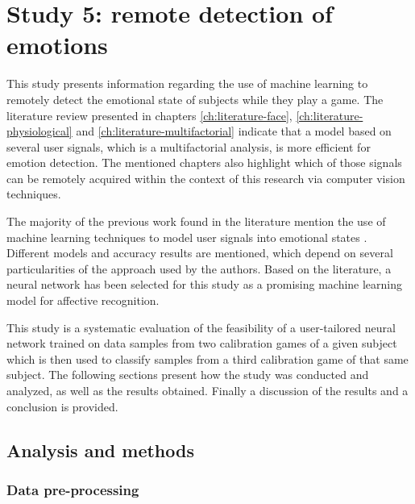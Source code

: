 \section{Study 5: remote detection of emotions}
\label{sec:experiment1-study5}

This study presents information regarding the use of machine learning to remotely detect the emotional state of subjects while they play a game. The literature review presented in chapters \ref{ch:literature-face}, \ref{ch:literature-physiological} and \ref{ch:literature-multifactorial} indicate that a model based on several user signals, which is a multifactorial analysis, is more efficient for emotion detection. The mentioned chapters also highlight which of those signals can be remotely acquired within the context of this research via computer vision techniques.

The majority of the previous work found in the literature mention the use of machine learning techniques to model user signals into emotional states \parencite{moghimi2017affective}. Different models and accuracy results are mentioned, which depend on several particularities of the approach used by the authors. Based on the literature, a neural network has been selected for this study as a promising machine learning model for affective recognition.

This study is a systematic evaluation of the feasibility of a user-tailored neural network trained on data samples from two calibration games of a given subject which is then used to classify samples from a third calibration game of that same subject. The following sections present how the study was conducted and analyzed, as well as the results obtained. Finally a discussion of the results and a conclusion is provided.

\subsection{Analysis and methods}
\label{sec:experiment1-study5-method}

\subsubsection{Data pre-processing}


